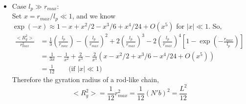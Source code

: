 \documentclass[a4paper]{article}
\begin{document}
\begin{enumerate}
\begin{itemize}
        \item Case $l_p \gg  r_{max}$: \\
            Set $x=r_{max} / l_p\ll  1$, and we know $\exp (-x) \approx 1 - x + x^2/2 - x^3/6 + x^4 / 24 + O(x^5)$ for $|x|\ll 1$.
            So, 
            \[
                \begin{aligned}
                    \frac{ <R_g^2 >}{ r_{max}^2 } 
                    &= \frac{1}{3} \left( \frac{l_p}{r_{max}} \right)
                   -            \left( \frac{l_p}{r_{max}} \right)^2
                   +2           \left( \frac{l_p}{r_{max}} \right)^3
                   -2           \left( \frac{l_p}{r_{max}} \right)^4 \left[ 1-\exp\left( - \frac{r_{max}}{l_p} \right)  \right] \\
                   &= \frac{1}{3x} -  \frac{1}{x^2} + \frac{2}{x^3} - \frac{2}{x^4} \left( x - x^2/2 + x^3/6 - x^4 / 24 + O(x^5)\right) \\
                   &=\frac{1}{12} \qquad \text{(if $|x| \ll  1$)}
                \end{aligned}
            \]
            Therefore the gyration radius of a rod-like chain,
            \[
                <R_g^2> =  \frac{1}{12} r_{max}^2 = \frac{1}{12} (N'b)^2 = \frac{L^2}{12}
            \]

    \end{itemize}
 
    
\end{enumerate}
\end{document}
